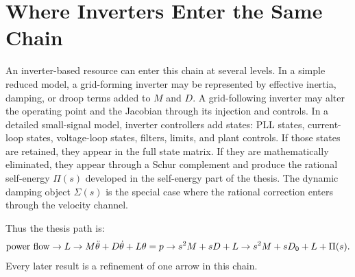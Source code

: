 \section{Where Inverters Enter the Same Chain}

An inverter-based resource can enter this chain at several levels. In a simple
reduced model, a grid-forming inverter may be represented by effective
inertia, damping, or droop terms added to \(M\) and \(D\). A grid-following
inverter may alter the operating point and the Jacobian through its injection
and controls. In a detailed small-signal model, inverter controllers add
states: PLL states, current-loop states, voltage-loop states, filters, limits,
and plant controls. If those states are retained, they appear in the full
state matrix. If they are mathematically eliminated, they appear through a
Schur complement and produce the rational self-energy \(\Pi(s)\) developed in
the self-energy part of the thesis. The dynamic damping object \(\Sigma(s)\)
is the special case where
the rational correction enters through the velocity channel.

Thus the thesis path is:
\begin{equation}
  \hbox{power flow}
  \rightarrow
  L
  \rightarrow
  M\ddot\theta+D\dot\theta+L\theta=p
  \rightarrow
  s^2M+sD+L
  \rightarrow
  s^2M+sD_0+L+\Pi(s).
  \label{eq:guide_thesis_path}
\end{equation}
Every later result is a refinement of one arrow in this chain.

